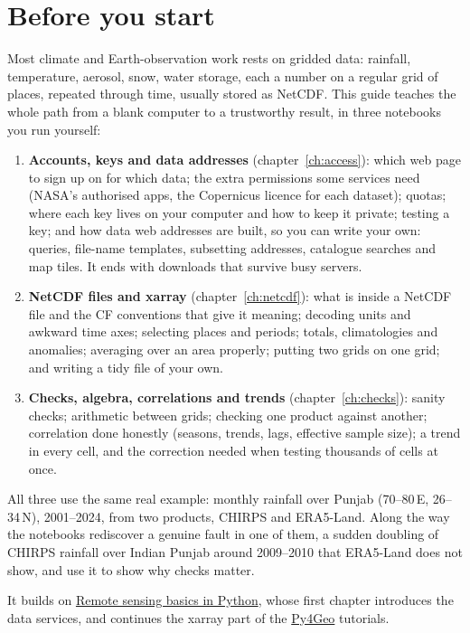 \chapter{Before you start}\label{ch:start}

Most climate and Earth-observation work rests on gridded data: rainfall, temperature, aerosol, snow, water storage, each a number on a regular grid of places, repeated through time, usually stored as NetCDF. This guide teaches the whole path from a blank computer to a trustworthy result, in three notebooks you run yourself:

\begin{enumerate}
\item \textbf{Accounts, keys and data addresses} (chapter~\ref{ch:access}): which web page to sign up on for which data; the extra permissions some services need (NASA's authorised apps, the Copernicus licence for each dataset); quotas; where each key lives on your computer and how to keep it private; testing a key; and how data web addresses are built, so you can write your own: queries, file-name templates, subsetting addresses, catalogue searches and map tiles. It ends with downloads that survive busy servers.
\item \textbf{NetCDF files and xarray} (chapter~\ref{ch:netcdf}): what is inside a NetCDF file and the CF conventions that give it meaning; decoding units and awkward time axes; selecting places and periods; totals, climatologies and anomalies; averaging over an area properly; putting two grids on one grid; and writing a tidy file of your own.
\item \textbf{Checks, algebra, correlations and trends} (chapter~\ref{ch:checks}): sanity checks; arithmetic between grids; checking one product against another; correlation done honestly (seasons, trends, lags, effective sample size); a trend in every cell, and the correction needed when testing thousands of cells at once.
\end{enumerate}

All three use the same real example: monthly rainfall over Punjab (70--80\,E, 26--34\,N), 2001--2024, from two products, CHIRPS and ERA5-Land. Along the way the notebooks rediscover a genuine fault in one of them, a sudden doubling of CHIRPS rainfall over Indian Punjab around 2009--2010 that ERA5-Land does not show, and use it to show why checks matter.

It builds on \href{https://ahmadammar.github.io/teaching/remote-sensing-basics/}{Remote sensing basics in Python}, whose first chapter introduces the data services, and continues the xarray part of the \href{https://github.com/GeospatialGeeks/Py4Geo}{Py4Geo} tutorials.

